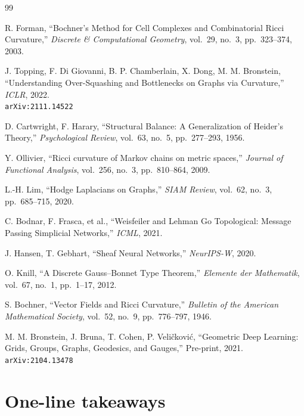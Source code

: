\documentclass[11pt,a4paper]{article}
\begin{document}
\begin{thebibliography}{99}

R. Forman, ``Bochner's Method for Cell Complexes and Combinatorial
Ricci Curvature,'' \emph{Discrete \& Computational Geometry},
vol.~29, no.~3, pp.~323--374, 2003.

J. Topping, F. Di Giovanni, B. P. Chamberlain, X. Dong, M. M.
Bronstein, ``Understanding Over-Squashing and Bottlenecks on Graphs
via Curvature,'' \emph{ICLR}, 2022.\\
\texttt{arXiv:2111.14522}

D. Cartwright, F. Harary, ``Structural Balance: A Generalization of
Heider's Theory,'' \emph{Psychological Review}, vol.~63, no.~5,
pp.~277--293, 1956.

Y. Ollivier, ``Ricci curvature of Markov chains on metric spaces,''
\emph{Journal of Functional Analysis}, vol.~256, no.~3,
pp.~810--864, 2009.

L.-H. Lim, ``Hodge Laplacians on Graphs,'' \emph{SIAM Review},
vol.~62, no.~3, pp.~685--715, 2020.

C. Bodnar, F. Frasca, et al., ``Weisfeiler and Lehman Go Topological:
Message Passing Simplicial Networks,'' \emph{ICML}, 2021.

J. Hansen, T. Gebhart, ``Sheaf Neural Networks,'' \emph{NeurIPS-W},
2020.

O. Knill, ``A Discrete Gauss--Bonnet Type Theorem,''
\emph{Elemente der Mathematik}, vol.~67, no.~1, pp.~1--17, 2012.

S. Bochner, ``Vector Fields and Ricci Curvature,'' \emph{Bulletin of
the American Mathematical Society}, vol.~52, no.~9,
pp.~776--797, 1946.

M. M. Bronstein, J. Bruna, T. Cohen, P. Veličković,
``Geometric Deep Learning: Grids, Groups, Graphs, Geodesics, and
Gauges,'' Pre-print, 2021.\\
\texttt{arXiv:2104.13478}

\end{thebibliography}

\section{One-line takeaways}
\end{document}
